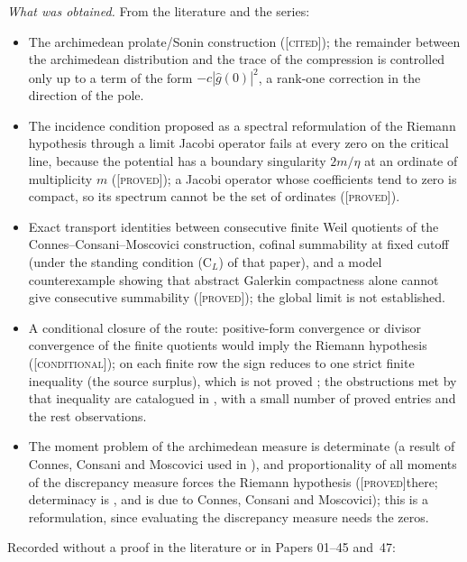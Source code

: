 \documentclass[11pt]{amsart}
\theoremstyle{definition}
\theoremstyle{remark}
\numberwithin{equation}{section}
\newcommand{\stag}[1]{\textsc{[#1]}}
\newcommand{\PROVED}{\stag{proved}}
\newcommand{\CITED}{\stag{cited}}
\newcommand{\COND}{\stag{conditional}}
\newcommand{\entry}[1]{\par\smallskip\noindent\textit{#1.}\enspace}
\begin{document}
\entry{What was obtained} From the literature and the series:
\begin{itemize}[leftmargin=2em]
\item The archimedean prolate/Sonin construction \cite{ConnesConsani2021} (\CITED); the remainder
  between the archimedean distribution and the trace of the compression is controlled only up to a
  term of the form $-c|\widehat g(0)|^2$, a rank-one correction in the direction of the pole.
\item The incidence condition proposed as a spectral reformulation of the Riemann hypothesis through
  a limit Jacobi operator fails at every zero on the critical line, because the potential has a
  boundary singularity $2m/\eta$ at an ordinate of multiplicity $m$ \cite[Proposition~3.3]{P23}
  (\PROVED); a Jacobi operator whose coefficients tend to zero is compact, so its spectrum cannot be
  the set of ordinates \cite[Proposition~3.2]{P23} (\PROVED).
\item Exact transport identities between consecutive finite Weil quotients of the
  Connes--Consani--Moscovici construction, cofinal summability at fixed cutoff (under the standing condition (C$_L$) of that paper), and a model
  counterexample showing that abstract Galerkin compactness alone cannot give consecutive summability
  \cite[Theorems~3.2, 4.1 and 7.4, Proposition~9.1]{P39} (\PROVED); the global limit is not established.
\item A conditional closure of the route: positive-form convergence or divisor convergence of the
  finite quotients would imply the Riemann hypothesis \cite[Theorem~5.1]{P40} (\COND); on each
  finite row the sign reduces to one strict finite inequality (the source surplus), which is not
  proved \cite[Section~9]{P40}; the obstructions met by that inequality are catalogued in
  \cite{P41}, with a small number of proved entries and the rest observations.
\item The moment problem of the archimedean measure is determinate (a result of Connes, Consani
  and Moscovici used in \cite{P22}), and proportionality of all moments of the discrepancy measure
  forces the Riemann hypothesis \cite[Theorems~4.1 and 4.4]{P22} (\PROVED there; determinacy is \cite[Lemma~2.5]{P22}, and is due to Connes, Consani and Moscovici); this is a reformulation, since evaluating the discrepancy measure needs
  the zeros.
\end{itemize}
Recorded without a proof in the literature or in Papers 01--45 and~47:
\end{document}
